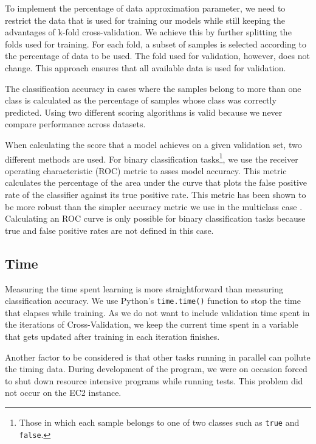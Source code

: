 \documentclass[a4paper,12pt,twoside,openright]{report}
\begin{document}
To implement the percentage of data approximation parameter, we need to restrict the data that is used for training our models while still keeping the advantages of k-fold cross-validation. We achieve this by further splitting the folds used for training. For each fold, a subset of samples is selected according to the percentage of data to be used. The fold used for validation, however, does not change. This approach ensures that all available data is used for validation.

The classification accuracy in cases where the samples belong to more than one class is calculated as the percentage of samples whose class was correctly predicted. Using two different scoring algorithms is valid because we never compare performance across datasets.

When calculating the score that a model achieves on a given validation set, two different methods are used. For binary classification tasks\footnote{Those in which each sample belongs to one of two classes such as \texttt{true} and \texttt{false}.}, we use the receiver operating characteristic (ROC) metric to asses model accuracy. This metric calculates the percentage of the area under the curve that plots the false positive rate of the classifier against its true positive rate. This metric has been shown to be more robust than the simpler accuracy metric we use in the multiclass case \cite{Bradley97theuse}. Calculating an ROC curve is only possible for binary classification tasks because true and false positive rates are not defined in this case.

\subsection{Time}
Measuring the time spent learning is more straightforward than measuring classification accuracy. We use Python's \texttt{time.time()} function to stop the time that elapses while training. As we do not want to include validation time spent in the iterations of Cross-Validation, we keep the current time spent in a variable that gets updated after training in each iteration finishes.

Another factor to be considered is that other tasks running in parallel can pollute the timing data. During development of the program, we were on occasion forced to shut down resource intensive programs while running tests. This problem did not occur on the EC2 instance. %
\end{document}
